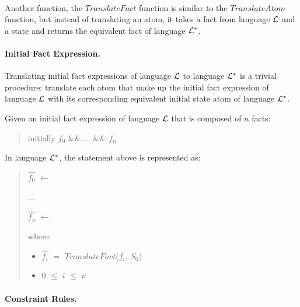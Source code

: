 \documentclass[10pt, twocolumn]{article}
\begin{document}
        \paragraph{}

          Another function, the $TranslateFact$ function is similar to the
          $TranslateAtom$ function, but instead of translating an atom, it
          takes a fact from language ${\cal L}$ and a state and returns the
          equivalent fact of language ${\cal L}^{*}$.

        \paragraph{Initial Fact Expression.}

          Translating initial fact expressions of language ${\cal L}$ to
          language ${\cal L}^{*}$ is a trivial procedure: translate each atom
          that make up the initial fact expression of language ${\cal L}$
          with its corresponding equivalent initial state atom of language
          ${\cal L}^{*}$. 

          Given an initial fact expression of language ${\cal L}$ that is
          composed of $n$ facts:

          \begin{quote}
            initially $f_{0}$ \&\& ... \&\& $f_{n}$
          \end{quote}

          In language ${\cal L}^{*}$, the statement above is represented as:

          \begin{quote}
            $\hat{f_{0}}$ $\leftarrow$

            ...

            $\hat{f_{n}}$ $\leftarrow$

            where:
              \begin{itemize}
                \item
                  $\hat{f_{i}}$ $=$ $TranslateFact$($f_{i}$, $S_{0}$)
                \item
                  $0$ $\leq$ $i$ $\leq$ $n$
              \end{itemize}
          \end{quote}

        \paragraph{Constraint Rules.}
\end{document}
